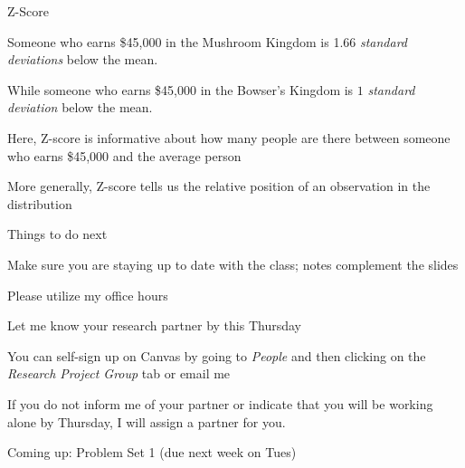 \documentclass{./../div_teaching_slides}
\begin{document}
\begin{frame}{Z-Score}
\begin{witemize}
\item Someone who earns \$45,000 in the Mushroom Kingdom is 1.66 \textit{standard deviations} below the mean.
\item While someone who earns \$45,000 in the  Bowser's Kingdom is $1$ \textit{standard deviation} below the mean.
  \item Here, Z-score is informative about how many people are there between someone who earns \$45,000 and the average person 
  \item More generally, Z-score tells us the relative position of an observation in the distribution
\end{witemize}
\end{frame}

\begin{frame}{Things to do next}
\begin{witemize}
\item Make sure you are staying up to date with the class; notes complement the slides
\item Please utilize my office hours
\item Let me know your research partner by this Thursday \vspace{0.5em}
\begin{mitemize}
  \item You can self-sign up on Canvas by going to \textit{People} and then clicking on the \textit{Research Project Group} tab or email me
\item If you do not inform me of your partner or indicate that you will be working alone by Thursday, I will assign a partner for you.
\end{mitemize}
\item Coming up: Problem Set 1 (due next week on Tues)
\end{witemize}
\end{frame}
\end{document}
